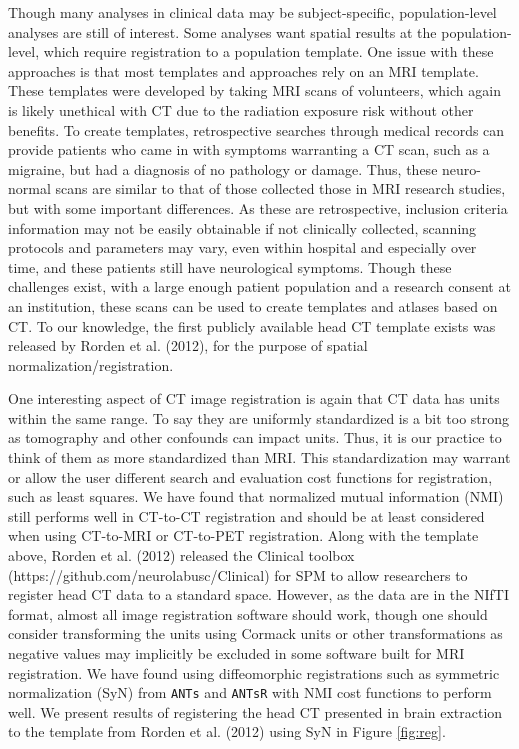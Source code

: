 \documentclass[]{elsarticle} %
\begin{document}
Though many analyses in clinical data may be subject-specific, population-level analyses are still of interest. Some analyses want spatial results at the population-level, which require registration to a population template. One issue with these approaches is that most templates and approaches rely on an MRI template. These templates were developed by taking MRI scans of volunteers, which again is likely unethical with CT due to the radiation exposure risk without other benefits. To create templates, retrospective searches through medical records can provide patients who came in with symptoms warranting a CT scan, such as a migraine, but had a diagnosis of no pathology or damage. Thus, these neuro-normal scans are similar to that of those collected those in MRI research studies, but with some important differences. As these are retrospective, inclusion criteria information may not be easily obtainable if not clinically collected, scanning protocols and parameters may vary, even within hospital and especially over time, and these patients still have neurological symptoms. Though these challenges exist, with a large enough patient population and a research consent at an institution, these scans can be used to create templates and atlases based on CT. To our knowledge, the first publicly available head CT template exists was released by Rorden et al. (2012), for the purpose of spatial normalization/registration.

One interesting aspect of CT image registration is again that CT data has units within the same range. To say they are uniformly standardized is a bit too strong as tomography and other confounds can impact units. Thus, it is our practice to think of them as more standardized than MRI. This standardization may warrant or allow the user different search and evaluation cost functions for registration, such as least squares. We have found that normalized mutual information (NMI) still performs well in CT-to-CT registration and should be at least considered when using CT-to-MRI or CT-to-PET registration. Along with the template above, Rorden et al. (2012) released the Clinical toolbox (https://github.com/neurolabusc/Clinical) for SPM to allow researchers to register head CT data to a standard space. However, as the data are in the NIfTI format, almost all image registration software should work, though one should consider transforming the units using Cormack units or other transformations as negative values may implicitly be excluded in some software built for MRI registration. We have found using diffeomorphic registrations such as symmetric normalization (SyN) from \texttt{ANTs} and \texttt{ANTsR} with NMI cost functions to perform well. We present results of registering the head CT presented in brain extraction to the template from Rorden et al. (2012) using SyN in Figure \ref{fig:reg}.
\end{document}
